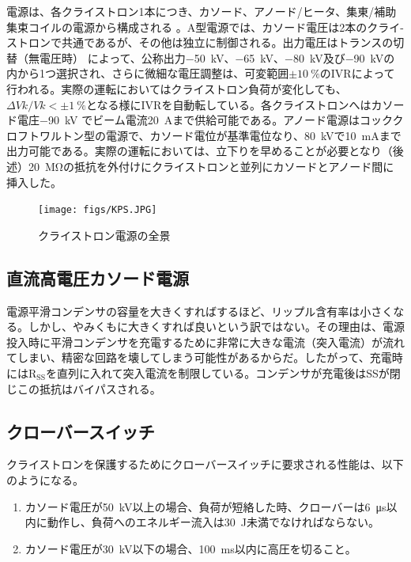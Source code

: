 \documentclass[book,openany]{jlreq}
\theoremstyle{definition}
\begin{document}
電源は、各クライストロン1本につき、カソード、アノード/ヒータ、集東/補助集束コイルの電源から構成される 。A型電源では、カソード電圧は2本のクライ-ストロンで共通であるが、その他は独立に制御される。出力電圧はトランスの切替（無電圧時） によって、公称出力\qty{-50}{\kilo\volt}、\qty{-65}{\kilo\volt}、\qty{-80}{\kilo\volt}及び\qty{-90}{\kilo\volt}の内から1つ選択され、さらに微細な電圧調整は、可変範囲$\pm \qty{10}{\percent}$のIVRによって行われる。実際の運転においてはクライストロン負荷が変化しても、$\Delta Vk/Vk<\pm \qty{1}{\percent}$となる様にIVRを自動転している。各クライストロンへはカソード電庄\qty{-90}{\kilo\volt} でビーム電流\qty{20}{\ampere}まで供給可能である。アノード電源はコッククロフトワルトン型の電源で、カソード電位が基準電位なり、\qty{+80}{\kilo\volt}で\qty{10}{\milli\ampere}まで出力可能である。実際の運転においては、立下りを早めることが必要となり（後述）\qty{20}{\mega\ohm}の抵抗を外付けにクライストロンと並列にカソードとアノード間に挿入した。



\begin{figure}[!htt]
    \begin{center}
        \texttt{[image: figs/KPS.JPG]}
        \caption{クライストロン電源の全景}
        \label{kps_photo}
    \end{center}
\end{figure}

\subsection{直流高電圧カソード電源}
電源平滑コンデンサの容量を大きくすればするほど、リップル含有率は小さくなる。しかし、やみくもに大きくすれば良いという訳ではない。その理由は、電源投入時に平滑コンデンサを充電するために非常に大きな電流（突入電流）が流れてしまい、精密な回路を壊してしまう可能性があるからだ。したがって、充電時には$\mathrm{R_{SS}}$を直列に入れて突入電流を制限している。コンデンサが充電後はSSが閉じこの抵抗はバイパスされる。


\subsection{クローバースイッチ}
クライストロンを保護するためにクローバースイッチに要求される性能は、以下のようになる。

\begin{enumerate}
    \item カソード電圧が\SI{50}{\kilo\volt}以上の場合、負荷が短絡した時、クローバーは\SI{6}{\micro\second}以内に動作し、負荷へのエネルギー流入は\SI{30}{\joule}未満でなければならない。
    \item カソード電圧が\SI{30}{\kilo\volt}以下の場合、\SI{100}{\milli\second}以内に高圧を切ること。
\end{enumerate}
\end{document}
